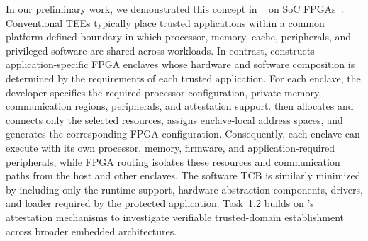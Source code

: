In our preliminary work, we demonstrated this concept in \byotee~\cite{armanuzzaman2024building} on SoC FPGAs~\cite{FPGA2019}.
Conventional TEEs typically place trusted applications within a common platform-defined boundary in which processor, memory, cache, peripherals, and privileged software are shared across workloads.
In contrast, \byotee constructs application-specific FPGA enclaves whose hardware and software composition is determined by the requirements of each trusted application.
For each enclave, the developer specifies the required processor configuration, private memory, communication regions, peripherals, and attestation support.
\byotee then allocates and connects only the selected resources, assigns enclave-local address spaces, and generates the corresponding FPGA configuration.
Consequently, each enclave can execute with its own processor, memory, firmware, and application-required peripherals, while FPGA routing isolates these resources and communication paths from the host and other enclaves.
The software TCB is similarly minimized by including only the runtime support, hardware-abstraction components, drivers, and loader required by the protected application.
Task~1.2 builds on \byotee's attestation mechanisms to investigate verifiable trusted-domain establishment across broader embedded architectures.

